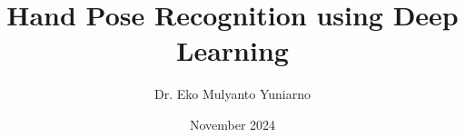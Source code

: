 \documentclass[a4paper,12pt]{book}
\begin{document}
\author{Dr. Eko Mulyanto Yuniarno}
\title{Hand Pose Recognition using Deep Learning}
\date{November 2024}

\frontmatter
\maketitle
\tableofcontents

\mainmatter



\backmatter
\end{document}
